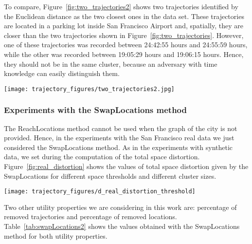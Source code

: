 To compare, Figure~\ref{fig:two_trajectories2} shows two trajectories
identified by the Euclidean distance as the two closest ones in the data set.
These trajectories are located in a parking lot inside
San Francisco Airport and,
spatially, they are closer than the two trajectories shown
in Figure~\ref{fig:two_trajectories}. However, one of these trajectories
was recorded between 24:42:55 hours and 24:55:59 hours, while the other
was recorded between 19:05:29 hours and 19:06:15 hours. Hence, they
should not be
in the same cluster, because an adversary with time knowledge can easily
distinguish them.

\begin{figure*}[p]
\centering
\texttt{[image: trajectory\_figures/two\_trajectories2.jpg]}
\caption{The two closest trajectories in the real-life data set
according to the Euclidean distance}
\label{fig:two_trajectories2}
\end{figure*}



\subsubsection{Experiments with the SwapLocations method}

The ReachLocations method cannot be used when the graph of the
city is not provided. Hence, in the experiments with
the San Francisco real data we just considered the SwapLocations method.
As in the experiments with synthetic data, we set 
during the computation of the total space distortion.
Figure~\ref{fig:real_distortion} shows the values of total space
distortion given by the SwapLocations for different space thresholds
and different cluster sizes.

\begin{figure*}[p]
\centering
\texttt{[image: trajectory\_figures/d\_real\_distortion\_threshold]}
\caption{Total space distortion (km) for SwapLocations using several
different space thresholds and cluster sizes on the real-life data set}
\label{fig:real_distortion}
\end{figure*}

Two other utility properties we are considering in this work are:
percentage of removed trajectories and percentage of removed locations.
Table~\ref{tab:swapLocations2} shows the values obtained with the
SwapLocations method for both utility properties.

